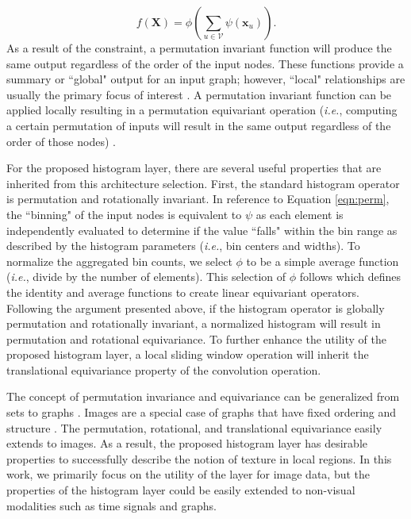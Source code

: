 \documentclass[journal]{IEEEtai}
\begin{document}
	\begin{equation}
	    f(\mathbf{X}) = \phi\left(\sum_{u \in \mathcal{V}}^{} \psi(\mathbf{x}_u)\right).
	\end{equation}\label{eqn:perm}
    As a result of the constraint, a permutation invariant function will produce the same output regardless of the order of the input nodes. These functions provide a summary or ``global" output for an input graph; however, ``local" relationships are usually the primary focus of interest \mbox{\cite{bronstein2021geometric}}. A permutation invariant function can be applied locally resulting in a permutation equivariant operation (\textit{i.e.}, computing a certain permutation of inputs will result in the same output regardless of the order of those nodes) \mbox{\cite{bronstein2021geometric}}.
    
    For the proposed histogram layer, there are several useful properties that are inherited from this architecture selection. First, the standard histogram operator is permutation and rotationally invariant. In reference to Equation {\ref{eqn:perm}}, the ``binning" of the input nodes is equivalent to $\psi$ as each element is independently evaluated to determine if the value ``falls" within the bin range as described by the histogram parameters (\textit{i.e.}, bin centers and widths). To normalize the aggregated bin counts, we select $\phi$ to be a simple average function (\textit{i.e.}, divide by the number of elements). This selection of $\phi$ follows \mbox{\cite{bronstein2021geometric}} which defines the identity and average functions to create linear equivariant operators. Following the argument presented above, if the histogram operator is globally permutation and rotationally invariant, a normalized histogram will result in permutation and rotational equivariance. To further enhance the utility of the proposed histogram layer, a local sliding window operation will inherit the translational equivariance property of the convolution operation.
    
    The concept of permutation invariance and equivariance can be generalized from sets to graphs \mbox{\cite{bronstein2021geometric}}. Images are a special case of graphs that have fixed ordering and structure \mbox{\cite{wu2020comprehensive,bronstein2021geometric}}. The permutation, rotational, and translational equivariance easily extends to images. As a result, the proposed histogram layer has desirable properties to successfully describe the notion of texture in local regions. In this work, we primarily focus on the utility of the layer for image data, but the properties of the histogram layer could be easily extended to non-visual modalities such as time signals and graphs. 
	
\end{document}
